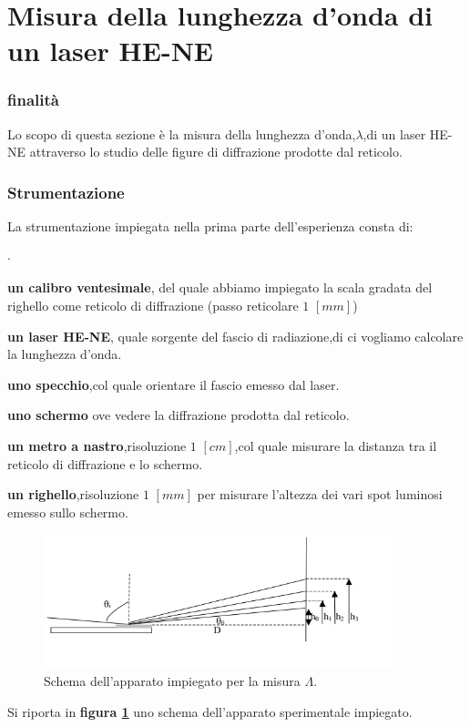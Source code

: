 \newpage
\part{Misura della lunghezza d'onda di un laser HE-NE } \label{part:Ottica_1A}
\section{finalità}
Lo scopo di questa sezione è la misura della lunghezza d'onda,$\lambda$,di 
un laser HE-NE attraverso lo studio delle figure di diffrazione prodotte 
dal reticolo.
\section{Strumentazione}
La strumentazione impiegata nella prima parte dell'esperienza consta di:
\begin{list}{$\cdot$}{}
\item \textbf{un calibro ventesimale}, del quale abbiamo impiegato la scala gradata del righello come reticolo
di diffrazione  (passo reticolare $1$ 
$[mm]$)%
\item \textbf{un laser HE-NE}, quale sorgente del fascio di radiazione,di ci vogliamo calcolare la lunghezza 
d'onda.
\item \textbf{uno specchio},col quale orientare il fascio emesso dal laser.
\item \textbf{uno schermo} ove vedere la diffrazione prodotta dal reticolo.
\item \textbf{un metro a nastro},risoluzione $1$ $[cm]$,col quale misurare la distanza tra il reticolo di 
diffrazione e lo schermo.
\item \textbf{un righello},risoluzione $1$ $[mm]$ per misurare l'altezza dei vari spot 
luminosi emesso sullo schermo.

\end{list}
\bigskip


\begin{figure} [!h]
	\centering
	\includegraphics[width=0.9\textwidth]{./pictures/immagine1}
	\caption{Schema dell'apparato impiegato per la misura $\Lambda$.}
	\label{fig:schema_appar}
\end{figure}
Si riporta in \textbf{figura \ref{fig:schema_appar} }uno schema dell'apparato sperimentale impiegato. 
